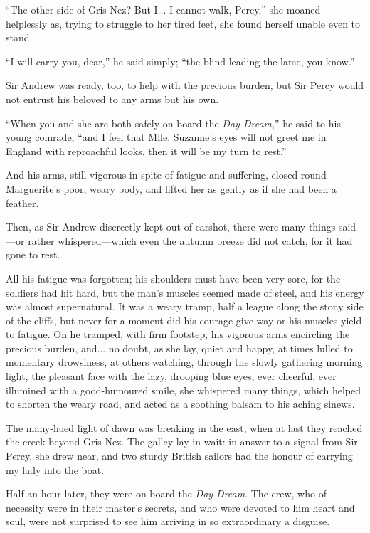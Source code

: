 \documentclass[paper=a5,BCOR=7mm,twoside,DIV=calc,12pt,usegeometry,chapterprefix,endperiod,headings=big]{scrbook}
\begin{document}
\enquote{The other side of Gris Nez? But I... I cannot walk, Percy,} she moaned helplessly as, trying to struggle to her tired feet, she found herself unable even to stand.

\enquote{I will carry you, dear,} he said simply; \enquote{the blind leading the lame, you know.}

Sir Andrew was ready, too, to help with the precious burden, but Sir Percy would not entrust his beloved to any arms but his own.

\enquote{When you and she are both safely on board the \textit{Day Dream},} he said to his young comrade, \enquote{and I feel that Mlle. Suzanne's eyes will not greet me in England with reproachful looks, then it will be my turn to rest.}

And his arms, still vigorous in spite of fatigue and suffering, closed round Marguerite's poor, weary body, and lifted her as gently as if she had been a feather.

Then, as Sir Andrew discreetly kept out of earshot, there were many things said---or rather whispered---which even the autumn breeze did not catch, for it had gone to rest.

All his fatigue was forgotten; his shoulders must have been very sore, for the soldiers had hit hard, but the man's muscles seemed made of steel, and his energy was almost supernatural. It was a weary tramp, half a league along the stony side of the cliffs, but never for a moment did his courage give way or his muscles yield to fatigue. On he tramped, with firm footstep, his vigorous arms encircling the precious burden, and... no doubt, as she lay, quiet and happy, at times lulled to momentary drowsiness, at others watching, through the slowly gathering morning light, the pleasant face with the lazy, drooping blue eyes, ever cheerful, ever illumined with a good-humoured smile, she whispered many things, which helped to shorten the weary road, and acted as a soothing balsam to his aching sinews.

The many-hued light of dawn was breaking in the east, when at last they reached the creek beyond Gris Nez. The galley lay in wait: in answer to a signal from Sir Percy, she drew near, and two sturdy British sailors had the honour of carrying my lady into the boat.

Half an hour later, they were on board the \textit{Day Dream}. The crew, who of necessity were in their master's secrets, and who were devoted to him heart and soul, were not surprised to see him arriving in so extraordinary a disguise.
\end{document}
